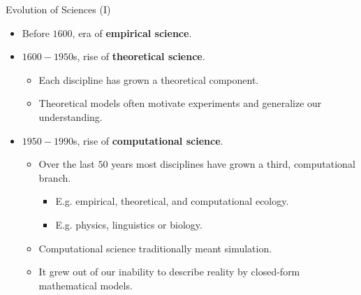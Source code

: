\begin{frame}{Evolution of Sciences (I)}
	\begin{itemize}
		\item Before $1600$, era of \textbf{empirical science}.
		\item $1600-1950$s, rise of \textbf{theoretical science}.
		      \begin{itemize}
			      \item Each discipline has grown a theoretical component.
			      \item Theoretical models often motivate experiments and generalize
			            our understanding.
		      \end{itemize}
		\item $1950-1990$s, rise of \textbf{computational science}.
		      \begin{itemize}
			      \item Over the last $50$ years most disciplines have grown a third,
			            computational branch.
			            \begin{itemize}
				            \item E.g. empirical, theoretical, and computational ecology.
				            \item E.g. physics, linguistics or biology.
			            \end{itemize}
			      \item Computational science traditionally meant simulation.
			      \item It grew out of our inability to describe reality by
			            closed-form mathematical models.
		      \end{itemize}
	\end{itemize}
\end{frame}

